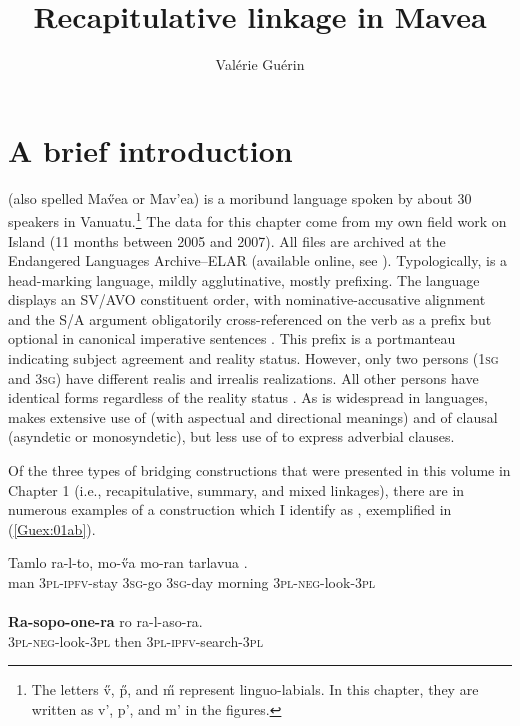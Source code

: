 \documentclass[output=paper]{LSP/langsci}
\author{Valérie Guérin\affiliation{James Cook University}}
\title{Recapitulative linkage in Mavea}
\begin{document}
\label{ch:8}

\section{A brief introduction} 
\label{Gusec:Introduction}
 (also spelled Ma\H{v}ea or Mav'ea) is a moribund  language spoken by about 30 speakers in Vanuatu.\footnote{The letters \H{v}, \H{p}, and \H{m} represent linguo-labials. In this chapter, they are written as v', p', and m' in the figures.} The data for this chapter come from my own field work on  Island (11 months between 2005 and 2007). All files are archived at the Endangered Languages Archive--ELAR (available online, see \citealt{guerin06}). Typologically,  is a head-marking language, mildly agglutinative, mostly prefixing. The language displays an SV\slash AVO constituent order, with nominative-accusative alignment and the S/A argument obligatorily cross-referenced on the verb as a prefix but optional in canonical imperative sentences \citep[][236]{guerin11}. This prefix is a portmanteau indicating subject agreement and reality status. However, only two persons (\textsc{1sg} and \textsc{3sg}) have different realis and irrealis realizations. All other persons have identical forms regardless of the reality status \citep[][61]{guerin11}. As is widespread in  languages,  makes extensive use of  (with aspectual and directional meanings) and of clausal  (asyndetic or monosyndetic), but less use of  to express adverbial clauses. 

Of the three types of bridging constructions that were presented in this volume in Chapter 1 (i.e., recapitulative, summary, and mixed linkages), there are in  numerous examples of a construction which I identify as , exemplified in (\ref{Guex:01ab}). 

\begin{exe}
\ex \label{Guex:01ab}
\begin{xlist}
\ex \label{Guex:01a}
\gll Tamlo   ra-l-to,            mo-\H{v}a    mo-ran      tarlavua  \underline{}.\\
man     \textsc{3pl}-\textsc{ipfv}-stay   \textsc{3sg}-go     \textsc{3sg}-day   morning  \textsc{3pl-neg}-look-\textsc{3pl}\\
\glt {}\\
\ex \label{Guex:01b}
\gll \textbf{Ra-sopo-one-ra} ro      ra-l-aso-ra.\\     	       
    \textsc{3pl-neg}-look-\textsc{3pl}   then  \textsc{3pl-ipfv}-search-\textsc{3pl}\\
\glt {} 
\end{xlist}
\end{exe}
\end{document}
